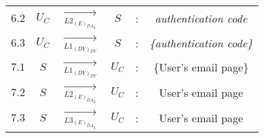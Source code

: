 \begin{center}
\begin{tabular}{ p{.25cm} c c c c c }
$6.2$ & $U_C$ & $\xrightarrow[L2_{{(E)}_{{DA}_2}}]{}$ & $S$ & : & \textit{authentication code} \\ 

$6.3$ & $U_C$ & $\xrightarrow[L1_{(DY)_{DY}}]{}$ & $S$ & : & \textit{\{authentication code\}} \\ 


$7.1$ & $S$ & $\xrightarrow[L1_{(DY)_{DY}}]{}$ & $U_C$ & : & \{User's email page\} \\ 

$7.2$ & $S$ & $\xrightarrow[L2_{{(E)}_{{DA}_2}}]{}$ & $U_C$ & : & User's email page \\ 

$7.3$ & $S$ & $\xrightarrow[L3_{{(E)}_{{DA}_1}}]{}$ & $U_C$ & : & User's email page \\ 

\end{tabular} 
\end{center} 

